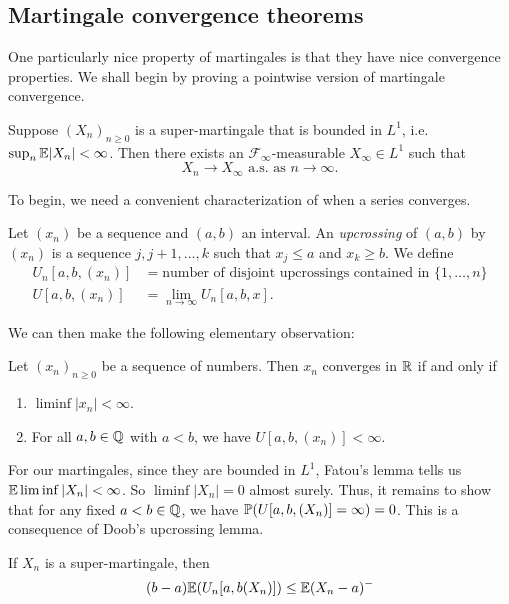 \documentclass[a4paper]{article}
\begin{document}
\subsection{Martingale convergence theorems}
One particularly nice property of martingales is that they have nice convergence properties. We shall begin by proving a pointwise version of martingale convergence.

\begin{thm}
  Suppose $(X_n)_{n \geq 0}$ is a super-martingale that is bounded in $L^1$, i.e.\ $\sup_n \E|X_n| < \infty$. Then there exists an $\mathcal{F}_\infty$-measurable $X_\infty \in L^1$ such that
  \[
    X_n \to X_\infty\text{ a.s. as }n \to \infty.
  \]
\end{thm}

To begin, we need a convenient characterization of when a series converges.
\begin{defi}[Upcrossing]
  Let $(x_n)$ be a sequence and $(a, b)$ an interval. An \emph{upcrossing} of $(a, b)$ by $(x_n)$ is a sequence $j, j + 1, \ldots, k$ such that $x_j \leq a$ and $x_k \geq b$. We define\index{$U[a, b, (x_n)$}
  \begin{align*}
    U_n[a, b, (x_n)] &= \text{number of disjoint upcrossings contained in }\{1, \ldots, n\}\\
    U[a, b, (x_n)] &= \lim_{n \to \infty} U_n[a, b, x].
  \end{align*}
\end{defi}

We can then make the following elementary observation:
\begin{lemma}
  Let $(x_n)_{n \geq 0}$ be a sequence of numbers. Then $x_n$ converges in $\R$ if and only if
  \begin{enumerate}
    \item $\liminf |x_n| < \infty$.
    \item For all $a, b \in \Q$ with $a < b$, we have $U[a, b, (x_n)] < \infty$.
  \end{enumerate}
\end{lemma}
For our martingales, since they are bounded in $L^1$, Fatou's lemma tells us $\E \liminf |X_n| < \infty$. So $\liminf |X_n| = 0$ almost surely. Thus, it remains to show that for any fixed $a < b \in \Q$, we have $\P(U[a, b, (X_n)] = \infty) = 0$. This is a consequence of Doob's upcrossing lemma.

\begin{lemma}
  If $X_n$ is a super-martingale, then
  \[
    (b - a) \E(U_n[a, b(X_n)]) \leq \E(X_n - a)^-
  \]
\end{lemma}
\end{document}
